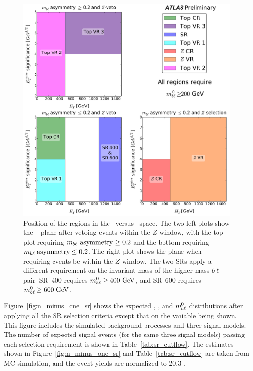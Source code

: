 \begin{figure}[ht]
  \centering
  \includegraphics[width=\textwidth]{figs/blstop/regions__met_sig__ht_plane.pdf}
  \caption{Position of the regions in the \METSIG\ versus \HT\ space.
    The two left plots show the \METSIG-\HT~plane after vetoing events within
    the $Z$ window, with the top plot requiring $m_{b\ell}~\mathrm{asymmetry} \geq 0.2$ and the
    bottom requiring $m_{b\ell}~\mathrm{asymmetry} \leq 0.2$.
    The right plot shows the plane when requiring events be within the $Z$
    window.
    The two SRs apply a different requirement on the
    invariant mass of the higher-mass $b\ell$ pair. SR~400 requires
    $\MBL^{0} \geq 400 \GeV$, and SR~600 requires $\MBL^{0} \geq 600 \GeV$.
  }
  \label{fig:region_coverage}
\end{figure}

Figure~\ref{fig:n_minus_one_sr} shows the expected \HT, \MBLASYM, and $m_{b\ell}^0$
distributions after applying all the SR selection criteria except that on the
variable being shown.
This figure includes the simulated background processes and three signal models.
The number of expected signal events (for the same three signal models)
passing each selection requirement is shown in Table~\ref{tab:sr_cutflow}.
The estimates shown in Figure~\ref{fig:n_minus_one_sr} and
Table~\ref{tab:sr_cutflow} are taken from MC simulation, and the event
yields are normalized to 20.3 \ifb.

